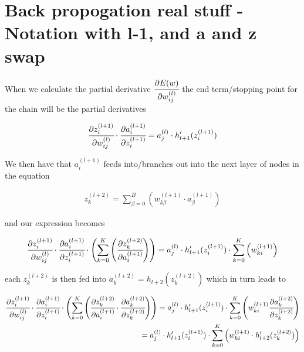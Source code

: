 \documentclass[12pt,a4paper]{report}
\begin{document}
\flushleft

\section*{Back propogation real stuff - Notation with l-1, and a and z swap}


When we calculate the partial derivative $\cfrac{\partial E(w)^{}}{\partial w_{ij}^{(l)}}$
the end term/stopping point for the chain will be the partial derivatives

\setcounter{equation}{0}
\begin{align*}
\cfrac{\partial z_{i}^{(l+1)}}{\partial w_{ij}^{(l)}} \cdot \cfrac{\partial a_{i}^{(l+1)}}{\partial z_{i}^{(l+1)}} = a_{j}^{(l)} \cdot h_{l+1}'(z_{i}^{(l+1)})
\end{align*}

We then have that \(a_{i}^{(l+1)}\) feeds into/branches out into the next layer of nodes in the equation

\setcounter{equation}{0}
\begin{align*}
z_{k}^{(l+2)} = \sum_{\beta=0}^{B} \left(w_{k\beta}^{(l+1)} \cdot a_{\beta}^{(l+1)}\right)
\end{align*}

and our expression becomes

\setcounter{equation}{0}
\begin{align*}
\cfrac{\partial z_{i}^{(l+1)}}{\partial w_{ij}^{(l)}} \cdot \cfrac{\partial a_{i}^{(l+1)}}{\partial z_{i}^{(l+1)}} \cdot \left( \sum_{k=0}^{K} \left(\cfrac{\partial z_{k}^{(l+2)}}{\partial a_{i}^{(l+1)}}\right)\right) = a_{j}^{(l)} \cdot h_{l+1}'(z_{i}^{(l+1)}) \cdot \sum_{k=0}^{K} \left(w_{ki}^{(l+1)}\right)
\end{align*}

each \(z_{k}^{(l+2)}\) is then fed into \(a_{k}^{(l+2)} = h_{l+2}(z_{k}^{(l+2)})\)
which in turn leads to


\setcounter{equation}{0}
\begin{align*}
\cfrac{\partial z_{i}^{(l+1)}}{\partial w_{ij}^{(l)}} \cdot \cfrac{\partial a_{i}^{(l+1)}}{\partial z_{i}^{(l+1)}} \cdot \left( \sum_{k=0}^{K} \left(\cfrac{\partial z_{k}^{(l+2)}}{\partial a_{i}^{(l+1)}} \cdot \cfrac{\partial a_{k}^{(l+2)}}{\partial z_{k}^{(l+2)}}\right)\right)
= a_{j}^{(l)} \cdot h_{l+1}'(z_{i}^{(l+1)}) \cdot \sum_{k=0}^{K} \left(w_{ki}^{(l+1)}\cfrac{\partial a_{k}^{(l+2)}}{\partial z_{k}^{(l+2)}}\right)\\
= a_{j}^{(l)} \cdot h_{l+1}'(z_{i}^{(l+1)}) \cdot \sum_{k=0}^{K} \left(w_{ki}^{(l+1)} \cdot h_{l+2}'(z_{k}^{(l+2)})\right)
\end{align*}
\end{document}
